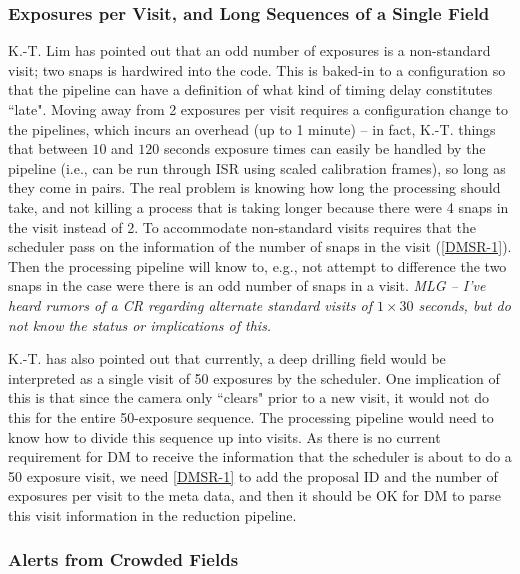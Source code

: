 \documentclass[DM,lsstdraft,toc]{lsstdoc}
\begin{document}
\subsubsection{Exposures per Visit, and Long Sequences of a Single Field}

K.-T. Lim has pointed out that an odd number of exposures is a non-standard visit; two snaps is hardwired into the code. This is baked-in to a configuration so that the pipeline can have a definition of what kind of timing delay constitutes ``late".  Moving away from 2 exposures per visit requires a configuration change to the pipelines, which incurs an overhead (up to 1 minute) -- in fact, K.-T. things that between $10$ and $120$ seconds exposure times can easily be handled by the pipeline (i.e., can be run through ISR using scaled calibration frames), so long as they come in pairs. The real problem is knowing how long the processing should take, and not killing a process that is taking longer because there were 4 snaps in the visit instead of 2. To accommodate non-standard visits requires that the scheduler pass on the information of the number of snaps in the visit (\ref{DMSR-1}). Then the processing pipeline will know to, e.g., not attempt to difference the two snaps in the case were there is an odd number of snaps in a visit. {\it MLG -- I've heard rumors of a CR regarding alternate standard visits of $1\times30$ seconds, but do not know the status or implications of this.}

K.-T. has also pointed out that currently, a deep drilling field would be interpreted as a single visit of 50 exposures by the scheduler. One implication of this is that since the camera only ``clears" prior to a new visit, it would not do this for the entire 50-exposure sequence. The processing pipeline would need to know how to divide this sequence up into visits. As there is no current requirement for DM to receive the information that the scheduler is about to do a 50 exposure visit, we need \ref{DMSR-1} to add the proposal ID and the number of exposures per visit to the meta data, and then it should be OK for DM to parse this visit information in the reduction pipeline.

\subsubsection{Alerts from Crowded Fields}
\end{document}
